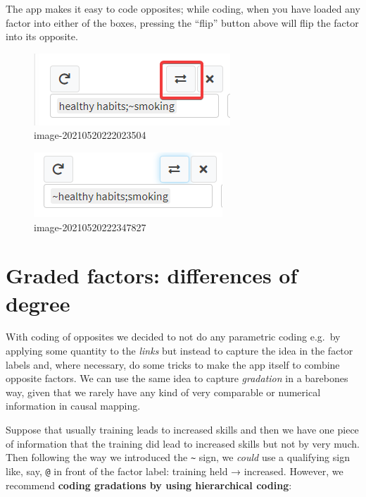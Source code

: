 \documentclass[
]{book}
\begin{document}
The app makes it easy to code opposites; while coding, when you have loaded any factor into either of the boxes, pressing the ``flip'' button above will flip the factor into its opposite.

\begin{figure}
\centering
\includegraphics{_assets/image-20210520222023504.png}
\caption{image-20210520222023504}
\end{figure}

\begin{figure}
\centering
\includegraphics{_assets/image-20210520222347827.png}
\caption{image-20210520222347827}
\end{figure}

\hypertarget{graded-factors-differences-of-degree}{%
\section{Graded factors: differences of degree}\label{graded-factors-differences-of-degree}}

With coding of opposites we decided to not do any parametric coding e.g.~by applying some quantity to the \emph{links} but instead to capture the idea in the factor labels and, where necessary, do some tricks to make the app itself to combine opposite factors. We can use the same idea to capture \emph{gradation} in a barebones way, given that we rarely have any kind of very comparable or numerical information in causal mapping.

Suppose that usually training leads to increased skills and then we have one piece of information that the training did lead to increased skills but not by very much. Then following the way we introduced the \texttt{\textasciitilde{}} sign, we \emph{could} use a qualifying sign like, say, \texttt{@} in front of the factor label: training held → \citet{skills} increased. However, we recommend \textbf{coding gradations by using hierarchical coding}:
\end{document}
